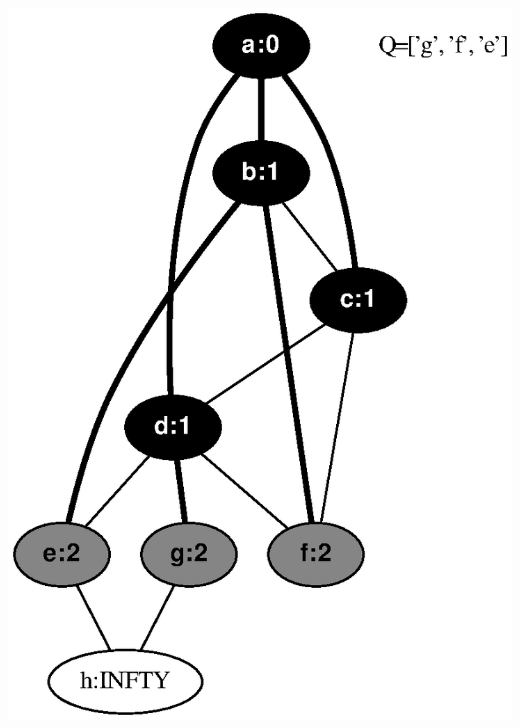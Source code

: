 \documentclass{article}
\begin{document}
\includegraphics[height=.3\textheight]{bfs_undirected_classroom_key_04.eps}
\vspace{1em}
\end{document}
